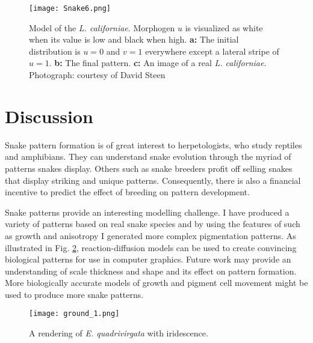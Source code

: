 \begin{figure}[ht]
	\centering
	\texttt{[image: Snake6.png]}
	\caption{Model of the \textit{L. californiae}. Morphogen $u$ is visualized as white when its value is low and black when high. \textbf{a:} The initial distribution is $u=0$ and $v=1$ everywhere except a lateral stripe  of $u=1$. \textbf{b:} The final pattern. \textbf{c:} An image of a real \textit{L. californiae}. \textcolor{citation-gray}{Photograph: courtesy of David Steen}}
	\label{fig:Snake6}
\end{figure}

\newpage

\section{Discussion}
Snake pattern formation is of great interest to herpetologists, who study reptiles and amphibians. They can understand snake evolution through the myriad of patterns snakes display. Others such as snake breeders profit off selling snakes that display striking and unique patterns. Consequently, there is also a financial incentive to predict the effect of breeding on pattern development. 

Snake patterns provide an interesting modelling challenge. I have produced a variety of patterns based on real snake species and by using the features of \ProgramName{} such as growth and anisotropy I generated more complex pigmentation patterns. As illustrated in Fig. \ref{fig:SnakeRendering}, reaction-diffusion models can be used to create convincing biological patterns for use in computer graphics. Future work may provide an understanding of scale thickness and shape and its effect on pattern formation. More biologically accurate models of growth and pigment cell movement might be used to produce more snake patterns.

\begin{figure}[ht]
	\centering
	\texttt{[image: ground\_1.png]}
	\caption{A rendering of \textit{E. quadrivirgata} with iridescence.}
	\label{fig:SnakeRendering}
\end{figure}

